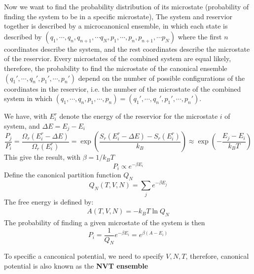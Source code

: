 \documentclass{article}
\begin{document}
Now we want to find the probability distribution of its microstate (probability of finding the system 
to be in a specific microstate), The system and reservior together is described by a microcanonical 
ensemble, in which each state is described by $(q_1,\cdots, q_n, q_{n+1}, \cdots q_{N}, p_1,\cdots, p_n, p_{n+1}, \cdots p_{N})$
where the first $n$ coordinates describe the system, and the rest coordinates describe the 
microstate of the reservior. Every microstates of the combined system are equal likely, therefore,
the probability to find the microstate of the canonical ensemble $(q_1',\cdots, q_n',p_1',\cdots, p_n')$ depend on the number 
of possible configurations of the coordinates in the reservior, i.e. the number of the 
microstate of the combined system in which $(q_1,\cdots, q_n,p_1,\cdots, p_n) = (q_1',\cdots, q_n',p_1',\cdots, p_n')$.

We have, with $E^r_i$ denote the energy of the reservior for 
the microstate $i$ of system, and $\Delta E = E_j - E_i$
\begin{equation}
    \frac{P_j}{P_i} = \frac{\Omega_r(E^r_i - \Delta E)}{\Omega_r(E^r_i)} = \exp\left( \frac{S_r(E^r_i-\Delta E)-S_r(E^r_i)}{k_B} \right)
    \approx \exp\left( -\frac{E_j-E_i}{k_BT} \right)
\end{equation}
This give the result, with $\beta = 1/k_BT$
\begin{equation}
    P_i \propto e^{-\beta E_i}
\end{equation}
Define the canonical partition function $Q_N$
\begin{equation}
    Q_N(T,V,N) = \sum_j e^{-\beta E_j}
\end{equation}
The free energy is defined by:
\begin{gather}
    A(T,V,N) = -k_BT\ln Q_N
\end{gather}
The probability of finding a given microstate of the system is then
\begin{equation}
    P_i = \frac{1}{Q_N} e^{-\beta E_i} = e^{\beta(A - E_i)}
\end{equation}

To specific a canconical potential, we need to specify $V, N, T$, therefore, canonical potential 
is also known as the \textbf{NVT ensemble}
\end{document}
